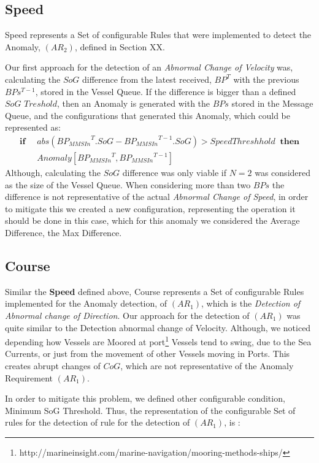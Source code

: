 \subsection{Speed}
\label{subsection: 4 Speed}
Speed represents a Set of configurable Rules that were implemented to detect the Anomaly, $(AR_2)$, defined in Section XX.

Our first approach for the detection of an \textit{Abnormal Change of Velocity} was, calculating the $SoG$ difference from the latest received, $BP^T$ with the previous $BPs^{T-1}$, stored in the Vessel Queue.
If the difference is bigger than a defined $SoG$ $Treshold$, then an Anomaly is generated with the $BPs$ stored in the Message Queue, and the configurations that generated this Anomaly, which could be represented as:
\begin{align*}
\mathbf{if}\;\;& abs({BP_{MMSIn}}^{T}.SoG - {BP_{MMSIn}}^{T-1}.SoG) > SpeedThreshhold
\;\;\mathbf{then} \\ 
&Anomaly[{BP_{MMSIn}}^{T}, {BP_{MMSIn}}^{T-1}] 
\end{align*}
Although, calculating the $SoG$ difference was only viable if  $N = 2 $ was considered as the size of the Vessel Queue.
When considering more than two $BPs$ the difference is not representative of the actual \textit{Abnormal Change of Speed}, in order to mitigate this we created a new configuration, representing the operation it should be done in this case, which for this anomaly we considered the Average Difference, the Max Difference.

\subsection{Course}
\label{subsection: 4 Course}
Similar the \textbf{Speed} defined above, Course represents a Set of configurable Rules implemented for the Anomaly detection, of $(AR_1)$, which is the \textit{Detection of Abnormal change of Direction}. 
Our approach for the detection of $(AR_1)$ was quite similar to the {Detection abnormal change of Velocity}. 
Although, we noticed depending how Vessels are Moored at port\footnote{http://marineinsight.com/marine-navigation/mooring-methods-ships/}  Vessels tend to swing, due to the Sea Currents, or just from the movement of other Vessels moving in Ports. This creates abrupt changes of $CoG$, which are not representative of the Anomaly Requirement $(AR_1)$.

In order to mitigate this problem, we defined other configurable condition, Minimum SoG Threshold. Thus, the representation of the configurable Set of rules for the detection of rule for the detection of $(AR_1)$, is :

